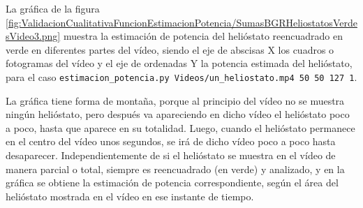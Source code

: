 La gráfica de la figura \ref{fig:ValidacionCualitativaFuncionEstimacionPotencia/SumasBGRHeliostatosVerdesVideo3.png} muestra la estimación de potencia del helióstato reencuadrado en verde en diferentes partes del vídeo, siendo el eje de abscisas X los cuadros o fotogramas del vídeo y el eje de ordenadas Y la potencia estimada del helióstato, para el caso \verb|estimacion_potencia.py Videos/un_heliostato.mp4 50 50 127 1|.

La gráfica tiene forma de montaña, porque al principio del vídeo no se muestra ningún helióstato, pero después va apareciendo en dicho vídeo el helióstato poco a poco, hasta que aparece en su totalidad. Luego, cuando el helióstato permanece en el centro del vídeo unos segundos, se irá de dicho vídeo poco a poco hasta desaparecer. Independientemente de si el helióstato se muestra en el vídeo de manera parcial o total, siempre es reencuadrado (en verde) y analizado, y en la gráfica se obtiene la estimación de potencia correspondiente, según el área del helióstato mostrada en el vídeo en ese instante de tiempo.